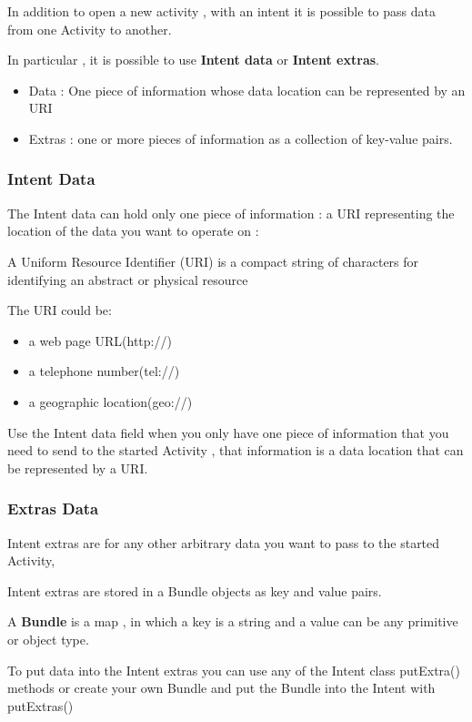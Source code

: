 \documentclass{article}
\begin{document}
  In addition to open a new activity , with an intent it is possible to pass data from one Activity to another.

  In particular , it is possible to use \textbf{Intent data} or \textbf{Intent extras}.

  \begin{itemize}
      \item Data : One piece of information whose data location can be represented by an URI
      \item Extras : one or more pieces of information as a collection of key-value pairs.
      
  \end{itemize}

\subsubsection{Intent Data}

The Intent data can hold only one piece of information : a URI representing the location of the data you want to operate on :

A Uniform Resource Identifier (URI) is a compact string of characters for identifying an abstract or physical resource

The URI could be:

\begin{itemize}
    \item a web page URL(http://)
    \item a telephone number(tel://)
    \item a geographic location(geo://) 
\end{itemize}

Use the Intent data field when you only have one piece of information that you need to send to the started Activity , that information is a data location that can be represented by a URI.

\subsubsection{Extras Data}

Intent extras are for any other arbitrary data you want to pass to the started Activity,

Intent extras are stored in a Bundle objects as key and value pairs.

A \textbf{Bundle} is a map , in which a key is a string and a value can be any primitive or object type.

To put data into the Intent extras you can use any of the Intent class putExtra() methods or create your own Bundle and put the Bundle into the Intent with putExtras()
\end{document}
